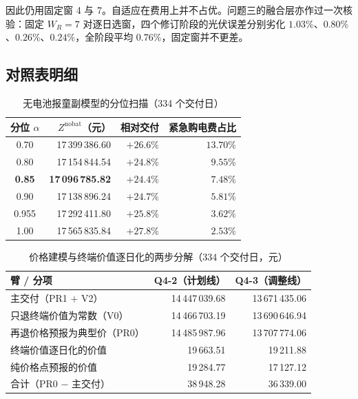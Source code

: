 \documentclass[12pt,a4paper]{ctexart}
\begin{document}
因此仍用固定窗 4 与 7。自适应在费用上并不占优。问题三的融合层亦作过一次核验：固定 $W_R=7$ 对逐日选窗，四个修订阶段的光伏误差分别劣化 $1.03\%$、$0.80\%$、$0.26\%$、$0.24\%$，全阶段平均 $0.76\%$，固定窗并不更差。

\subsection{对照表明细}

\begin{table}[H]
\centering\small
\caption{无电池报童副模型的分位扫描（334 个交付日）}
\begin{tabular}{crrr}
\toprule
分位 $\alpha$ & $Z^{\mathrm{nobat}}$（元） & 相对交付 & 紧急购电费占比 \\
\midrule
0.70  & 17\,399\,386.60 & $+26.6\%$ & $13.70\%$ \\
0.80  & 17\,154\,844.54 & $+24.8\%$ & $9.55\%$ \\
\textbf{0.85} & \textbf{17\,096\,785.82} & $\bm{+24.4\%}$ & $7.48\%$ \\
0.90  & 17\,138\,896.24 & $+24.7\%$ & $5.81\%$ \\
0.955 & 17\,292\,411.80 & $+25.8\%$ & $3.62\%$ \\
1.00  & 17\,565\,835.84 & $+27.8\%$ & $2.53\%$ \\
\bottomrule
\end{tabular}
\label{tab:nobat}
\end{table}

\begin{table}[H]
\centering\small
\caption{价格建模与终端价值逐日化的两步分解（334 个交付日，元）}
\begin{tabular}{lrr}
\toprule
臂 / 分项 & Q4-2（计划线） & Q4-3（调整线） \\
\midrule
主交付（PR1 $+$ V2） & 14\,447\,039.68 & 13\,671\,435.06 \\
只退终端价值为常数（V0） & 14\,466\,703.19 & 13\,690\,646.94 \\
再退价格预报为典型价（PR0） & 14\,485\,987.96 & 13\,707\,774.06 \\
\midrule
终端价值逐日化的价值 & 19\,663.51 & 19\,211.88 \\
纯价格点预报的价值 & 19\,284.77 & 17\,127.12 \\
\quad 合计（PR0 $-$ 主交付） & 38\,948.28 & 36\,339.00 \\
\bottomrule
\end{tabular}
\label{tab:aux_price}
\end{table}
\end{document}
